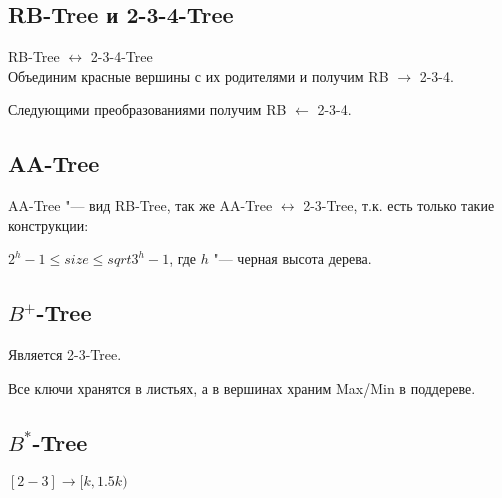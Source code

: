 
\subsection{RB-Tree и 2-3-4-Tree}

RB-Tree $\longleftrightarrow$ 2-3-4-Tree\\
Объединим красные вершины с их родителями и получим RB $\longrightarrow$ 2-3-4.


Следующими преобразованиями получим RB $\longleftarrow$ 2-3-4.


\subsection{AA-Tree}

AA-Tree "--- вид RB-Tree, так же  AA-Tree $\longleftrightarrow$ 2-3-Tree, т.к. есть только такие конструкции:


$2^{h} - 1 \leqslant size \leqslant sqrt{3}^{h} - 1$, где $h$ "--- черная высота дерева.\\

\subsection{$B^{+}$-Tree}

Является 2-3-Tree.

Все ключи хранятся в листьях, а в вершинах храним Max/Min в поддереве.\\

\subsection{$B^{*}$-Tree}

$[2-3] \longrightarrow [k, 1.5k )$